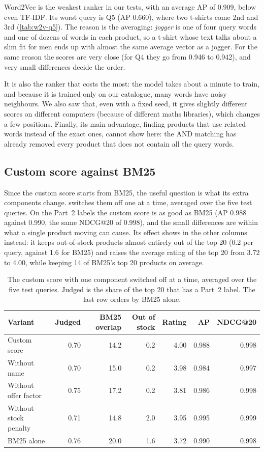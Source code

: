 \documentclass[11pt,a4paper]{article}
\begin{document}
Word2Vec is the weakest ranker in our tests, with an average AP of 0.909, below even TF-IDF. Its worst query is Q5 (AP 0.660), where two t-shirts come 2nd and 3rd (\cref{tab:w2v-q5}). The reason is the averaging: \emph{jogger} is one of four query words and one of dozens of words in each product, so a t-shirt whose text talks about a slim fit for men ends up with almost the same average vector as a jogger. For the same reason the scores are very close (for Q4 they go from 0.946 to 0.942), and very small differences decide the order.

It is also the ranker that costs the most: the model takes about a minute to train, and because it is trained only on our catalogue, many words have noisy neighbours. We also saw that, even with a fixed seed, it gives slightly different scores on different computers (because of different maths libraries), which changes a few positions. Finally, its main advantage, finding products that use related words instead of the exact ones, cannot show here: the AND matching has already removed every product that does not contain all the query words.

\subsection{Custom score against BM25}
\label{sec:custom-comparison}

Since the custom score starts from BM25, the useful question is what its extra
components change.  switches them off one at a time,
averaged over the five test queries. On the Part~2 labels the custom score is
as good as BM25 (AP 0.988 against 0.990, the same NDCG@20 of 0.998), and the
small differences are within what a single product moving can cause. Its
effect shows in the other columns instead: it keeps out-of-stock products
almost entirely out of the top 20 (0.2 per query, against 1.6 for BM25) and
raises the average rating of the top 20 from 3.72 to 4.00, while keeping 14 of
BM25's top 20 products on average.

\begin{table}[htbp]
  \centering
  \small
  \caption{The custom score with one component switched off at a time, averaged
  over the five test queries. Judged is the share of the top 20 that has a
  Part~2 label. The last row orders by BM25 alone.}
  \label{tab:custom-ablation}
  \begin{tabular}{lrrrrrr}
    \toprule
    Variant & Judged & BM25 overlap & Out of stock & Rating & AP & NDCG@20 \\
    \midrule
    Custom score & 0.70 & 14.2 & 0.2 & 4.00 & 0.988 & 0.998 \\
    Without name & 0.70 & 15.0 & 0.2 & 3.98 & 0.984 & 0.997 \\
    Without offer factor & 0.75 & 17.2 & 0.2 & 3.81 & 0.986 & 0.998 \\
    Without stock penalty & 0.71 & 14.8 & 2.0 & 3.95 & 0.995 & 0.999 \\
    BM25 alone & 0.76 & 20.0 & 1.6 & 3.72 & 0.990 & 0.998 \\
    \bottomrule
  \end{tabular}
\end{table}
\end{document}
